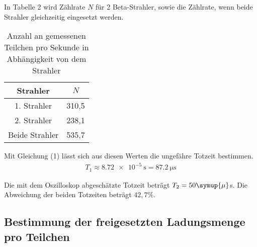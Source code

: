 In Tabelle 2 wird Zählrate $N$ für 2 Beta-Strahler, sowie die Zählrate, wenn beide Strahler gleichzeitig
eingesetzt werden.

\begin{table}[H]
  \centering
  \caption{Anzahl an gemessenen Teilchen pro Sekunde in Abhängigkeit von dem Strahler}
  \label{tab:Rechteckspannung}
  \begin{tabular}{c c}
    \toprule
    Strahler & $N$  \\
    \midrule
    1. Strahler & 310,5 \\
    2. Strahler & 238,1\\
    Beide Strahler & 535,7 \\
    \bottomrule
  \end{tabular}
\end{table}

Mit Gleichung (1) lässt sich aus diesen Werten die ungefähre Totzeit bestimmen.
\begin{align*}
  T_1 \approx \SI{8.72e-5}{\second} = \SI{87,2}{\micro\second}
\end{align*}

Die mit dem Oszilloskop abgeschätzte Totzeit beträgt $T_2 = 50 \symup{\mu}$s.
Die Abweichung der beiden Totzeiten beträgt $42,7 \%$.


\subsection{Bestimmung der freigesetzten Ladungsmenge pro Teilchen}


